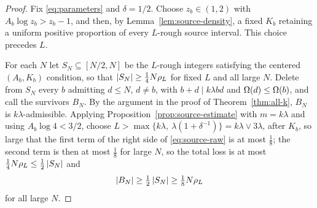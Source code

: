 \documentclass[11pt]{article}
\begin{document}
\begin{proof}
Fix \eqref{eq:parameters} and \(\delta=1/2\). Choose \(z_b\in(1,2)\) with
\(A_b\log z_b>z_b-1\), and then, by Lemma~\ref{lem:source-density}, a fixed
\(K_b\) retaining a uniform positive proportion of every \(L\)-rough source
interval. This choice precedes \(L\).

For each \(N\) let \(S_N\subseteq[N/2,N]\) be the \(L\)-rough integers
satisfying the centered \((A_b,K_b)\) condition, so that
\(\left|S_N\right|\geq\frac14N\rho_L\) for fixed \(L\) and all large \(N\). Delete
from \(S_N\) every \(b\) admitting \(d\leq N\), \(d\ne b\), with
\(b+d\mid k\lambda bd\) and \(\Omega(d)\leq\Omega(b)\), and call the survivors
\(B_N\). By the argument in the proof of Theorem~\ref{thm:all-k}, \(B_N\) is
\(k\lambda\)-admissible. Applying Proposition~\ref{prop:source-estimate} with
\(m=k\lambda\) and using \(A_b\log4<3/2\), choose
\(L>\max\{k\lambda,\ \lambda(1+\delta^{-1})\}=k\lambda\vee3\lambda\), after
\(K_b\), so large that the
first term of the right side of \eqref{eq:source-raw} is at most
\(\frac18\); the second term is then at most \(\frac18\) for large \(N\), so
the total loss is at most \(\frac14N\rho_L\leq\frac12\left|S_N\right|\) and
\begin{equation}\label{eq:B-density}
 \left|B_N\right|\geq\tfrac12\left|S_N\right|\geq\tfrac18N\rho_L
\end{equation}
for all large \(N\).


\end{proof}
\end{document}
